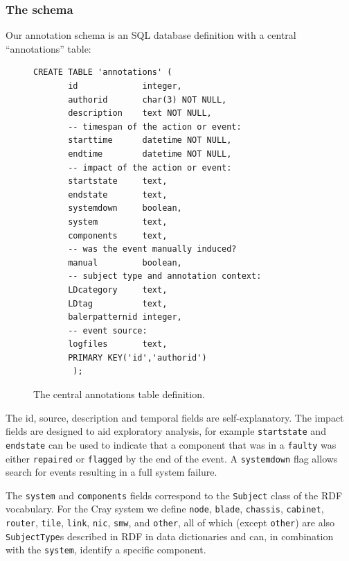 \subsubsection{The schema}

Our annotation schema is an SQL database definition with a central 
``annotations'' table:

\begin{figure}[H]
\begin{small}
\begin{verbatim}
CREATE TABLE 'annotations' (
       id             integer,
       authorid       char(3) NOT NULL,
       description    text NOT NULL,
       -- timespan of the action or event:
       starttime      datetime NOT NULL,
       endtime        datetime NOT NULL,
       -- impact of the action or event:
       startstate     text,
       endstate       text,
       systemdown     boolean,
       system         text,
       components     text,
       -- was the event manually induced?
       manual         boolean,
       -- subject type and annotation context:
       LDcategory     text,
       LDtag          text,
       balerpatternid integer,
       -- event source:
       logfiles       text,
       PRIMARY KEY('id','authorid')
        );
\end{verbatim}
\end{small}
\caption{The central annotations table definition. }
\label{f:ann-table}
\end{figure}

The id, source, description and temporal fields are self-explanatory. 
The impact fields are designed to aid exploratory analysis, for example
\texttt{startstate} and \texttt{endstate} can be used to indicate that
a component that was in a \texttt{faulty} was either \texttt{repaired}
or \texttt{flagged} by the end of the event. A \texttt{systemdown} flag
allows search for events resulting in a full system failure.

The \texttt{system} and \texttt{components} fields correspond to the 
\texttt{Subject} class of the RDF vocabulary.
For the Cray system we define \texttt{node}, \texttt{blade}, \texttt{chassis},
\texttt{cabinet}, \texttt{router}, \texttt{tile}, \texttt{link}, \texttt{nic},
\texttt{smw}, and \texttt{other}, all of which (except \texttt{other}) are 
also \texttt{SubjectType}s described in RDF in data dictionaries and can, in
combination with the \texttt{system}, identify a specific component.


